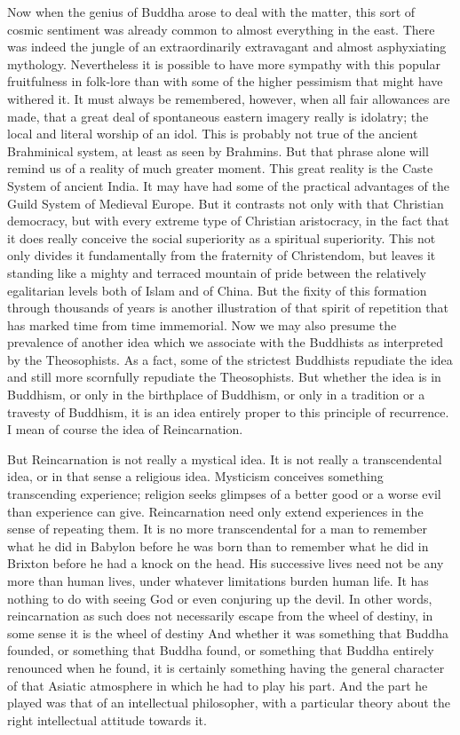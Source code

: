 Now when the genius of Buddha arose to deal with the matter, this sort of cosmic sentiment was already common to almost everything in the east. There was indeed the jungle of an extraordinarily extravagant and almost asphyxiating mythology. Nevertheless it is possible to have more sympathy with this popular fruitfulness in folk-lore than with some of the higher pessimism that might have withered it. It must always be remembered, however, when all fair allowances are made, that a great deal of spontaneous eastern imagery really is idolatry; the local and literal worship of an idol. This is probably not true of the ancient Brahminical system, at least as seen by Brahmins. But that phrase alone will remind us of a reality of much greater moment. This great reality is the Caste System of ancient India. It may have had some of the practical advantages of the Guild System of Medieval Europe. But it contrasts not only with that Christian democracy, but with every extreme type of Christian aristocracy, in the fact that it does really conceive the social superiority as a spiritual superiority. This not only divides it fundamentally from the fraternity of Christendom, but leaves it standing like a mighty and terraced mountain of pride between the relatively egalitarian levels both of Islam and of China. But the fixity of this formation through thousands of years is another illustration of that spirit of repetition that has marked time from time immemorial. Now we may also presume the prevalence of another idea which we associate with the Buddhists as interpreted by the Theosophists. As a fact, some of the strictest Buddhists repudiate the idea and still more scornfully repudiate the Theosophists. But whether the idea is in Buddhism, or only in the birthplace of Buddhism, or only in a tradition or a travesty of Buddhism, it is an idea entirely proper to this principle of recurrence. I mean of course the idea of Reincarnation.

But Reincarnation is not really a mystical idea. It is not really a transcendental idea, or in that sense a religious idea. Mysticism conceives something transcending experience; religion seeks glimpses of a better good or a worse evil than experience can give. Reincarnation need only extend experiences in the sense of repeating them. It is no more transcendental for a man to remember what he did in Babylon before he was born than to remember what he did in Brixton before he had a knock on the head. His successive lives need not be any more than human lives, under whatever limitations burden human life. It has nothing to do with seeing God or even conjuring up the devil. In other words, reincarnation as such does not necessarily escape from the wheel of destiny, in some sense it is the wheel of destiny And whether it was something that Buddha founded, or something that Buddha found, or something that Buddha entirely renounced when he found, it is certainly something having the general character of that Asiatic atmosphere in which he had to play his part. And the part he played was that of an intellectual philosopher, with a particular theory about the right intellectual attitude towards it.

